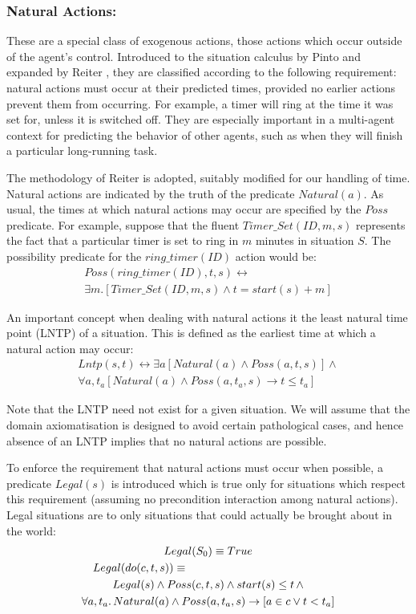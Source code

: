 \documentclass[letterpaper]{article}
\begin{document}
\subsubsection{Natural Actions:}
These are a special class of exogenous actions, those
actions which occur outside of the agent's control.
Introduced to the situation
calculus by Pinto \cite{pinto94temporal} and expanded by Reiter \cite{reiter96sc_nat_conc},
they are classified according to the following requirement: natural
actions must occur at their predicted times, provided no earlier actions
prevent them from occurring. For example, a timer will ring at the
time it was set for, unless it is switched off.
They are especially important in a multi-agent context for predicting the
behavior of other agents, such as when they will finish a particular
long-running task.

The methodology of Reiter is adopted, suitably
modified for our handling of time. Natural actions are indicated by the
truth of the predicate $Natural(a)$. As usual, the times at which
natural actions may occur are specified by the $Poss$ predicate.
For example, suppose that the fluent $Timer\_Set(ID,m,s)$ represents
the fact that a particular timer is set to ring in $m$ minutes in
situation $S$. The possibility predicate for the $ring\_timer(ID)$
action would be:
\begin{multline}
Poss(ring\_timer(ID),t,s)\leftrightarrow\\
\exists m.\left[Timer\_Set(ID,m,s)\wedge t=start(s)+m\right]
\end{multline}

An important concept when dealing with natural actions it the least
natural time point (LNTP) of a situation. This is defined as the earliest
time at which a natural action may occur:
\begin{multline}
\label{eqn:lntp_def}
Lntp(s,t)\leftrightarrow \exists a\left[Natural(a)\wedge Poss(a,t,s)\right]\wedge\\
\forall a,t_{a}\left[Natural(a)\wedge Poss(a,t_{a},s)\rightarrow t\leq t_{a}\right]
\end{multline}

Note that the LNTP need not exist for a given situation.
We will assume that the domain axiomatisation
is designed to avoid certain pathological cases, and hence absence of an
LNTP implies that no natural actions are possible.

To enforce the requirement that natural actions must occur when possible,
a predicate $Legal(s)$ is introduced which is true only for situations
which respect this requirement (assuming no precondition interaction
among natural actions).  Legal situations are to only situations that could
actually be brought about in the world:
\begin{multline}
\label{eqn:legal_def}
Legal(S_0) \equiv True\\
\shoveleft{Legal(do(c,t,s)) \equiv}\\
Legal(s)\wedge Poss(c,t,s)\wedge start(s)\leq t \, \wedge\\
\forall a,t_{a}.\,Natural(a)\wedge Poss(a,t_{a},s)\rightarrow\left[a\in c\vee t<t_{a}\right]
\end{multline}
\end{document}
